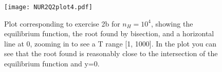 \begin{figure}[h!]
  \centering
  \texttt{[image: NUR2Q2plot4.pdf]}
  \caption{Plot corresponding to exercise 2b for $n_H = 10^4$, showing the equilibrium function, the root found by bisection, and a horizontal line at 0, zooming in to see a T range [1, 1000]. In the plot you can see that the root found is reasonably close to the intersection of the equilibrium function and y=0.}
  \label{fig:fig4}
\end{figure} 
